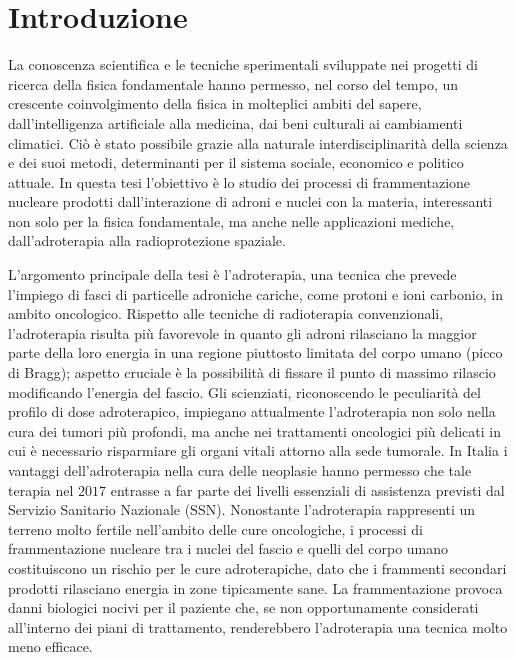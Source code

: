 \documentclass[12pt,a4paper,twoside]{report}
\begin{document}
	\chapter*{Introduzione}
	La conoscenza scientifica e le tecniche sperimentali sviluppate nei progetti di ricerca della fisica fondamentale hanno permesso, nel corso del tempo, un crescente coinvolgimento della fisica in molteplici ambiti del sapere, dall'intelligenza artificiale alla medicina, dai beni culturali ai cambiamenti climatici. Ciò è stato possibile grazie alla naturale interdisciplinarità della scienza e dei suoi metodi, determinanti per il sistema sociale, economico e politico attuale. In questa tesi l'obiettivo è lo studio dei processi di frammentazione nucleare prodotti dall'interazione di adroni e nuclei con la materia, interessanti non solo per la fisica fondamentale, ma anche nelle applicazioni mediche, dall'adroterapia alla radioprotezione spaziale.
	
	L'argomento principale della tesi è l'adroterapia, una tecnica che prevede l'impiego di fasci di particelle adroniche cariche, come protoni e ioni carbonio, in ambito oncologico. Rispetto alle tecniche di radioterapia convenzionali, l'adroterapia risulta più favorevole in quanto gli adroni rilasciano la maggior parte della loro energia in una regione piuttosto limitata del corpo umano (picco di Bragg); aspetto cruciale è la possibilità di fissare il punto di massimo rilascio modificando l'energia del fascio. Gli scienziati, riconoscendo le peculiarità del profilo di dose adroterapico, impiegano attualmente l'adroterapia non solo nella cura dei tumori più profondi, ma anche nei trattamenti oncologici più delicati in cui è necessario risparmiare gli organi vitali attorno alla sede tumorale. In Italia i vantaggi dell'adroterapia nella cura delle neoplasie hanno permesso che tale terapia nel $2017$ entrasse a far parte dei livelli essenziali di assistenza previsti dal Servizio Sanitario Nazionale (SSN). Nonostante l'adroterapia rappresenti un terreno molto fertile nell'ambito delle cure oncologiche, i processi di frammentazione nucleare tra i nuclei del fascio e quelli del corpo umano costituiscono un rischio per le cure adroterapiche, dato che i frammenti secondari prodotti rilasciano energia in zone tipicamente sane. La frammentazione provoca danni biologici nocivi per il paziente che, se non opportunamente considerati all'interno dei piani di trattamento, renderebbero l'adroterapia una tecnica molto meno efficace.
	
\end{document}
